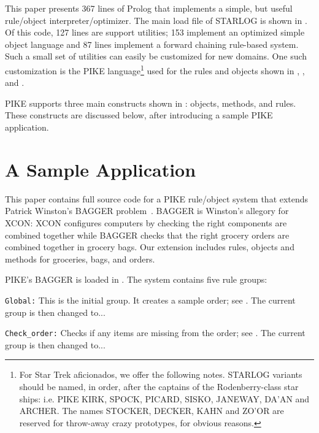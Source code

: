\documentclass[twocolumn,global]{sys/svjour}
\begin{document}


This paper presents 367 lines of Prolog that implements a simple, but
useful rule/object interpreter/optimizer. The main load file of
STARLOG is shown in . Of this code, 127 lines are
support utilities; 153 implement an optimized simple object language
and 87 lines implement a forward chaining rule-based system. Such a
small set of utilities can easily be customized for new domains. One
such customization is the PIKE language\footnote{For Star Trek
aficionados, we offer the following notes. STARLOG variants should be
named, in order, after the  captains of the Rodenberry-class star
ships: i.e.  PIKE KIRK, SPOCK, PICARD, SISKO, JANEWAY, DA'AN and
ARCHER.
 The names
 STOCKER, DECKER, KAHN and ZO'OR are reserved
 for throw-away crazy prototypes,
 for obvious reasons.} used for the rules and objects shown in
, ,  and
.


PIKE supports three main constructs shown in : objects,
methods, and rules. These constructs are discussed below, after
introducing a sample PIKE application.


\section{A Sample Application}

This paper contains full source code for a PIKE rule/object system
that extends Patrick Winston's BAGGER problem~\cite{winston84}.
BAGGER is Winston's allegory for XCON: XCON configures computers by
checking the right components are combined together while BAGGER
checks that the right grocery orders are combined together in grocery
bags. Our extension includes rules, objects and methods for
groceries, bags, and orders.


 PIKE's BAGGER is loaded in .
The system contains five rule groups: \bd \item[{\tt Global:}] This
is the initial group. It creates a sample order; see
. The current group is then changed to...
 \item[{\tt Check\_order:}]
 Checks if any items are missing from the order; see
 .
 The current group is then changed to...
\end{document}
